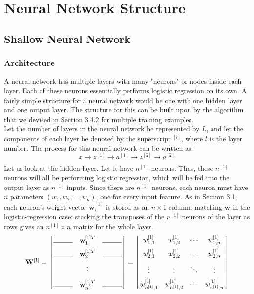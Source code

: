\documentclass{article}
\begin{document}
\section{Neural Network Structure}
\subsection{Shallow Neural Network}
\subsubsection{Architecture}
A neural network has multiple layers with many "neurons" or nodes inside each layer. Each of these neurons essentially performs logistic regression on its own. A fairly simple structure for a neural network would be one with one hidden layer and one output layer. The structure for this can be built upon by the algorithm that we devised in Section 3.4.2 for multiple training examples.
\\Let the number of layers in the neural network be represented by $L$, and let the components of each layer be denoted by the superscript $^{[l]}$, where $l$ is the layer number. The process for this neural network can be written as:
$$x \xrightarrow{} z^{[1]} \xrightarrow[]{} a^{[1]} \xrightarrow{} z^{[2]} \xrightarrow{} a^{[2]}$$
Let us look at the hidden layer. Let it have $n^{[1]}$ neurons. Thus, these $n^{[1]}$ neurons will all be performing logistic regression, which will be fed into the output layer as $n^{[1]}$ inputs. Since there are $n^{[1]}$ neurons, each neuron must have $n$ parameters $(w_1, w_2, \dots, w_{n})$, one for every input feature. As in Section 3.1, each neuron's weight vector $\mathbf{w}_i^{[1]}$ is stored as an $n \times 1$ column, matching $\mathbf{w}$ in the logistic-regression case; stacking the transposes of the $n^{[1]}$ neurons of the layer as rows gives an $n^{[1]} \times n$ matrix for the whole layer.
$$\mathbf{W}^{[1]} = \begin{bmatrix}
\rule{1cm}{0.4pt} & \mathbf{w}_1^{[1]T} & \rule{1cm}{0.4pt} \\[6pt]
\rule{1cm}{0.4pt} & \mathbf{w}_2^{[1]T} & \rule{1cm}{0.4pt} \\[6pt]
& \vdots & \\[6pt]
\rule{1cm}{0.4pt} & \mathbf{w}_{n^{[1]}}^{[1]T} & \rule{1cm}{0.4pt}
\end{bmatrix} = \begin{bmatrix}
w_{1,1}^{[1]} & w_{1,2}^{[1]} & \cdots & w_{1,n}^{[1]} \\[6pt]
w_{2,1}^{[1]} & w_{2,2}^{[1]} & \cdots & w_{2,n}^{[1]} \\[6pt]
\vdots & \vdots & \ddots & \vdots \\[6pt]
w_{n^{[1]},1}^{[1]} & w_{n^{[1]},2}^{[1]} & \cdots & w_{n^{[1]},n}^{[1]}
\end{bmatrix}$$
\end{document}
